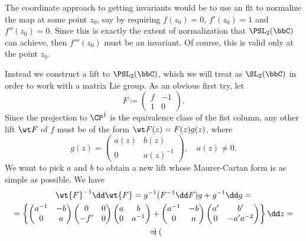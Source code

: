 \begin{example}
    The coordinate approach to getting invariants would be to use an \gls{flt} to normalize the map at some point $z_0$, say by requiring $f(z_0)=0$, $f'(z_0)=1$ and $f''(z_0)=0$. Since this is exactly the extent of normalization that $\PSL_2(\bbC)$ can achieve, then $f'''(z_0)$ must be an invariant. Of course, this is valid only at the point $z_0$.

    Instead we construct a lift to $\PSL_2(\bbC)$, which we will treat as $\SL_2(\bbC)$ in order to work with a matrix Lie group. As an obvious first try, let 
    \[F\coloneqq \begin{pmatrix}
        f&-1\\
        1&0
    \end{pmatrix}.
    \]
    Since the projection to $\CP^1$ is the equivalence class of the fist column, any other lift $\wt F$ of $f$ must be of the form $\wt F(z)=F(z)g(z)$, where 
    \[g(z)=\begin{pmatrix}
        a(z)& b(z)\\
        0 & a(z)^{-1}
    \end{pmatrix},\quad a(z)\neq 0.\]
    We want to pick $a$ and $b$ to obtain a new lift whose Maurer-Cartan form is as simple as possible. We have 
    \begin{multline}
        \wt{F}^{-1}\dd\wt{F}=g^{-1}(F^{-1}\dd F)g+g^{-1}\dd g=\\
        =\left\{
        \begin{pmatrix}
            a^{-1} & -b \\
            0 & a
        \end{pmatrix}
        \begin{pmatrix}
            0 & 0 \\
            -f' & 0
        \end{pmatrix}
        \begin{pmatrix}
            a & b \\
            0 & a^{-1}
        \end{pmatrix}+
        \begin{pmatrix}
            a^{-1} & -b \\
            0 & a
        \end{pmatrix}
        \begin{pmatrix}
            a' & b' \\
            0 & -a'a^{-2}
        \end{pmatrix}
        \right\}\dd z=\\
        =\begin{pmatrix}

\end{pmatrix}
\end{multline}
\end{example}
